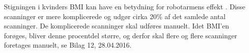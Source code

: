 Stigningen i kvinders BMI kan have en betydning for robotarmens effekt \cite{kvinderovervaegt}. Disse scanninger er mere komplicerede og udgør cirka 20\% af det samlede antal scanninger. De komplicerede scanninger skal udføres manuelt. Idet BMI’en forøges, bliver denne procentdel større, og derfor skal flere og flere scanninger foretages manuelt, se Bilag 12, 28.04.2016. 

